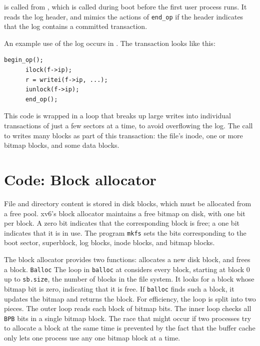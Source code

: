 is called from 
,
which is called during boot before the first user process runs.
It reads the log header, and mimics the actions of
\lstinline{end_op}
if the header indicates that the log contains a committed transaction.

An example use of the log occurs in 
.
The transaction looks like this:
\begin{lstlisting}[]
      begin_op();
      ilock(f->ip);
      r = writei(f->ip, ...);
      iunlock(f->ip);
      end_op();
\end{lstlisting}
This code is wrapped in a loop that breaks up large writes into individual
transactions of just a few sectors at a time, to avoid overflowing
the log.  The call to
writes many blocks as part of this
transaction: the file's inode, one or more bitmap blocks, and some data
blocks.
\section{Code: Block allocator}

File and directory content is stored in disk blocks,
which must be allocated from a free pool.
xv6's block allocator
maintains a free bitmap on disk, with one bit per block. 
A zero bit indicates that the corresponding block is free;
a one bit indicates that it is in use.
The program
\lstinline{mkfs}
sets the bits corresponding to the boot sector, superblock, log blocks, inode
blocks, and bitmap blocks.

The block allocator provides two functions:
allocates a new disk block, and
frees a block.
\lstinline{Balloc}
The loop in
\lstinline{balloc}
at
considers every block, starting at block 0 up to 
\lstinline{sb.size},
the number of blocks in the file system.
It looks for a block whose bitmap bit is zero,
indicating that it is free.
If
\lstinline{balloc}
finds such a block, it updates the bitmap 
and returns the block.
For efficiency, the loop is split into two 
pieces.
The outer loop reads each block of bitmap bits.
The inner loop checks all 
\lstinline{BPB}
bits in a single bitmap block.
The race that might occur if two processes try to allocate
a block at the same time is prevented by the fact that
the buffer cache only lets one process use any one bitmap block at a time.

